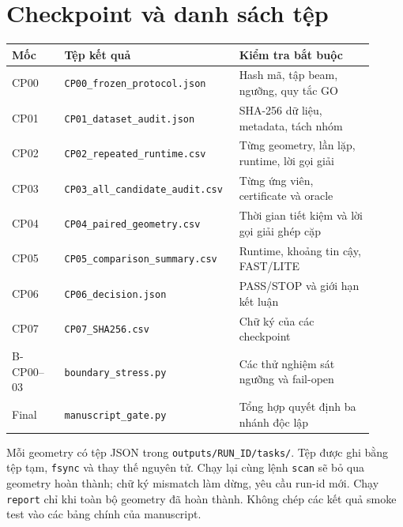 \documentclass[11pt,onecolumn]{IEEEtran}
\begin{document}
\section{Checkpoint và danh sách tệp}
\begin{longtable}{p{0.14\linewidth}p{0.41\linewidth}p{0.36\linewidth}}
\toprule
Mốc & Tệp kết quả & Kiểm tra bắt buộc\\\midrule\endhead
CP00 & \texttt{CP00\_frozen\_protocol.json} & Hash mã, tập beam, ngưỡng, quy tắc GO\\
CP01 & \texttt{CP01\_dataset\_audit.json} & SHA-256 dữ liệu, metadata, tách nhóm\\
CP02 & \texttt{CP02\_repeated\_runtime.csv} & Từng geometry, lần lặp, runtime, lời gọi giải\\
CP03 & \texttt{CP03\_all\_candidate\_audit.csv} & Từng ứng viên, certificate và oracle\\
CP04 & \texttt{CP04\_paired\_geometry.csv} & Thời gian tiết kiệm và lời gọi giải ghép cặp\\
CP05 & \texttt{CP05\_comparison\_summary.csv} & Runtime, khoảng tin cậy, FAST/LITE\\
CP06 & \texttt{CP06\_decision.json} & PASS/STOP và giới hạn kết luận\\
CP07 & \texttt{CP07\_SHA256.csv} & Chữ ký của các checkpoint\\
B-CP00--03 & \texttt{boundary\_stress.py} & Các thử nghiệm sát ngưỡng và fail-open\\
Final & \texttt{manuscript\_gate.py} & Tổng hợp quyết định ba nhánh độc lập\\\bottomrule
\end{longtable}

Mỗi geometry có tệp JSON trong \texttt{outputs/RUN\_ID/tasks/}. Tệp được ghi bằng tệp tạm, \texttt{fsync} và thay thế nguyên tử. Chạy lại cùng lệnh \texttt{scan} sẽ bỏ qua geometry hoàn thành; chữ ký mismatch làm dừng, yêu cầu run-id mới. Chạy \texttt{report} chỉ khi toàn bộ geometry đã hoàn thành. Không chép các kết quả smoke test vào các bảng chính của manuscript.
\end{document}

